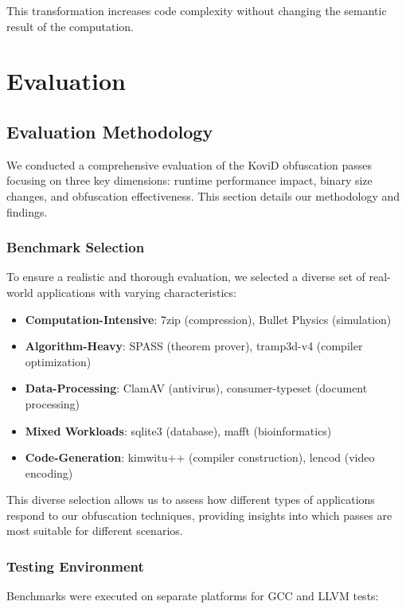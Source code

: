 \documentclass[conference]{IEEEtran}
\begin{document}
This transformation increases code complexity without changing the semantic result of the computation.

\section{Evaluation}

\subsection{Evaluation Methodology}
We conducted a comprehensive evaluation of the KoviD obfuscation passes focusing on three key dimensions: runtime performance impact, binary size changes, and obfuscation effectiveness. This section details our methodology and findings.

\subsubsection{Benchmark Selection}
To ensure a realistic and thorough evaluation, we selected a diverse set of real-world applications with varying characteristics:

\begin{itemize}
    \item \textbf{Computation-Intensive}: 7zip (compression), Bullet Physics (simulation)
    \item \textbf{Algorithm-Heavy}: SPASS (theorem prover), tramp3d-v4 (compiler optimization)
    \item \textbf{Data-Processing}: ClamAV (antivirus), consumer-typeset (document processing)
    \item \textbf{Mixed Workloads}: sqlite3 (database), mafft (bioinformatics)
    \item \textbf{Code-Generation}: kimwitu++ (compiler construction), lencod (video encoding)
\end{itemize}

This diverse selection allows us to assess how different types of applications respond to our obfuscation techniques, providing insights into which passes are most suitable for different scenarios.

\subsubsection{Testing Environment}
Benchmarks were executed on separate platforms for GCC and LLVM tests:
\end{document}

